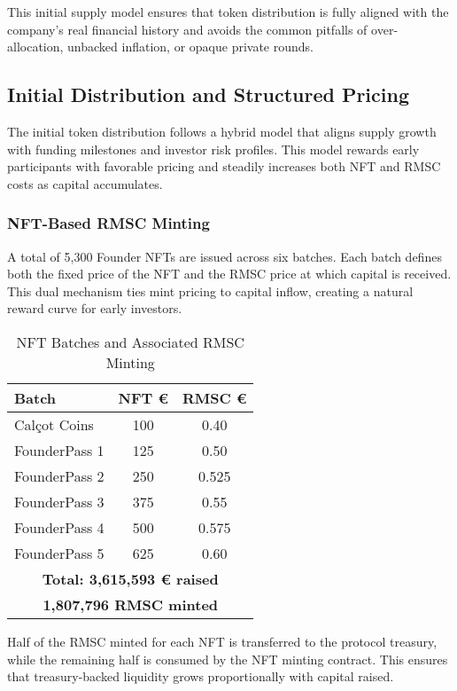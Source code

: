 \documentclass[conference]{IEEEtran}
\begin{document}
This initial supply model ensures that token distribution is fully aligned with the company’s real financial history and avoids the common pitfalls of over-allocation, unbacked inflation, or opaque private rounds.

\subsection{Initial Distribution and Structured Pricing}

The initial token distribution follows a hybrid model that aligns supply growth with funding milestones and investor risk profiles. This model rewards early participants with favorable pricing and steadily increases both NFT and RMSC costs as capital accumulates.

\subsubsection{NFT-Based RMSC Minting}

A total of 5,300 Founder NFTs are issued across six batches. Each batch defines both the fixed price of the NFT and the RMSC price at which capital is received. This dual mechanism ties mint pricing to capital inflow, creating a natural reward curve for early investors.

\begin{table}[ht]
\caption{NFT Batches and Associated RMSC Minting}
\centering
\small
\begin{tabular}{|l|c|c|}
\hline
\textbf{Batch} & \textbf{NFT €} & \textbf{RMSC €} \\
\hline
Calçot Coins     & 100  & 0.40  \\
FounderPass 1    & 125  & 0.50  \\
FounderPass 2    & 250  & 0.525 \\
FounderPass 3    & 375  & 0.55  \\
FounderPass 4    & 500  & 0.575 \\
FounderPass 5    & 625  & 0.60  \\
\hline
\multicolumn{3}{|c|}{\textbf{Total: 3,615,593 € raised}} \\
\multicolumn{3}{|c|}{\textbf{1,807,796 RMSC minted}} \\
\hline
\end{tabular}
\end{table}

Half of the RMSC minted for each NFT is transferred to the protocol treasury, while the remaining half is consumed by the NFT minting contract. This ensures that treasury-backed liquidity grows proportionally with capital raised.
\end{document}
